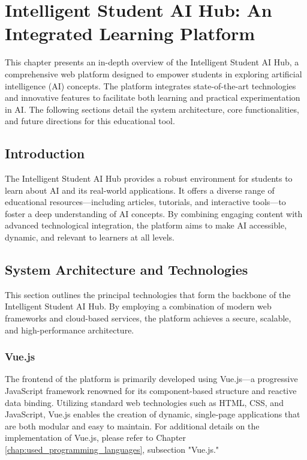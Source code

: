 \chapter{Intelligent Student AI Hub: An Integrated Learning Platform} 
\label{chap:Student_AI_Hub}


This chapter presents an in-depth overview of the Intelligent Student AI Hub, 
a comprehensive web platform designed to empower students in exploring artificial intelligence (AI) concepts. 
The platform integrates state-of-the-art technologies and innovative features to facilitate both learning and practical experimentation in AI. 
The following sections detail the system architecture, core functionalities, and future directions for this educational tool.

\section{Introduction}

The Intelligent Student AI Hub provides a robust environment for students to learn about AI and its real-world applications. 
It offers a diverse range of educational resources—including articles, tutorials, and interactive tools—to foster a deep understanding of AI concepts. 
By combining engaging content with advanced technological integration, the platform aims to make AI accessible, dynamic, and relevant to learners at all levels.

\section{System Architecture and Technologies}

This section outlines the principal technologies that form the backbone of the Intelligent Student AI Hub. By employing a combination of modern web frameworks and cloud-based services, the platform achieves a secure, scalable, and high-performance architecture.

\subsection{Vue.js}

The frontend of the platform is primarily developed using Vue.js—a progressive JavaScript framework renowned for its component-based structure and reactive data binding. Utilizing standard web technologies such as HTML, CSS, and JavaScript, Vue.js enables the creation of dynamic, single-page applications that are both modular and easy to maintain. For additional details on the implementation of Vue.js, please refer to Chapter \ref{chap:used_programming_languages}, subsection "Vue.js."

